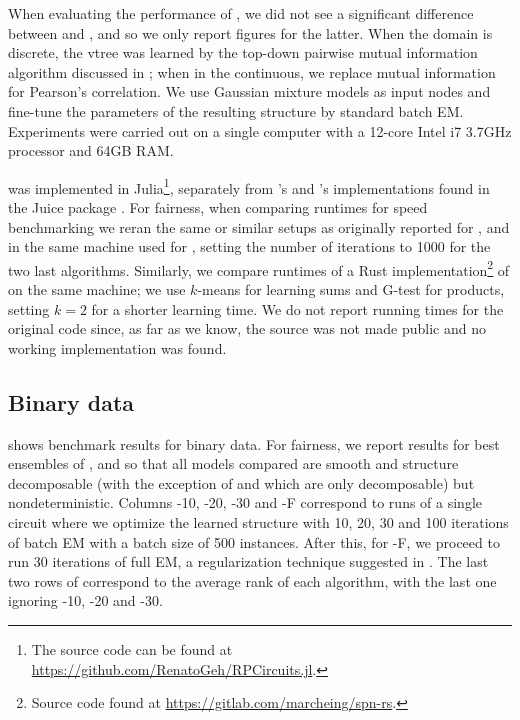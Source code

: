 When evaluating the performance of , we did not see a significant difference
between  and , and so we only report figures for the latter.
When the domain is discrete, the vtree was learned by the top-down pairwise mutual information
algorithm discussed in ; when in the continuous, we replace mutual
information for Pearson's correlation. We use Gaussian mixture models as input nodes and fine-tune
the parameters of the resulting structure by standard batch EM. Experiments were carried out on a
single computer with a 12-core Intel i7 3.7GHz processor and 64GB RAM.

 was implemented in Julia\footnote{The source code can be found at
\url{https://github.com/RenatoGeh/RPCircuits.jl}.}, separately from 's and
's implementations found in the Juice package \citep{dang21}. For fairness,
when comparing runtimes for speed benchmarking we reran the same or similar setups as originally
reported for ,  and  in the same machine used
for , setting the number of iterations to 1000 for the two last \incrclass{}
algorithms. Similarly, we compare runtimes of a Rust implementation\footnote{Source code found at
\url{https://gitlab.com/marcheing/spn-rs}.} of  on the same machine; we use
$k$-means for learning sums and G-test for products, setting $k=2$ for a shorter learning time. We
do not report running times for the original  code since, as far as we know,
the source was not made public and no working implementation was found.

\subsection{Binary data}

 shows benchmark results for binary data. For fairness, we report results for best
ensembles of ,  and  so that all models
compared are smooth and structure decomposable (with the exception of  and
 which are only decomposable) but nondeterministic. Columns
-10, -20, -30 and -F
correspond to runs of a single  circuit where we optimize the learned structure
with 10, 20, 30 and 100 iterations of batch EM with a batch size of 500 instances. After this, for
-F, we proceed to run 30 iterations of full EM, a regularization technique
suggested in \citet{liu21}. The last two rows of  correspond to the average rank
of each algorithm, with the last one ignoring -10, -20 and
-30.

